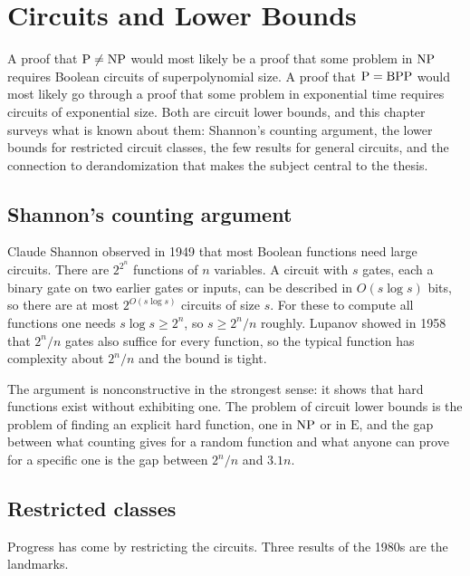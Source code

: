 \chapter{Circuits and Lower Bounds}
\label{ch:circuits}

A proof that $\mathrm{P} \neq \mathrm{NP}$ would most likely be a proof that some problem in $\mathrm{NP}$ requires Boolean circuits of superpolynomial size. A proof that $\mathrm{P} = \mathrm{BPP}$ would most likely go through a proof that some problem in exponential time requires circuits of exponential size. Both are circuit lower bounds, and this chapter surveys what is known about them: Shannon's counting argument, the lower bounds for restricted circuit classes, the few results for general circuits, and the connection to derandomization that makes the subject central to the thesis.

\section{Shannon's counting argument}

Claude Shannon observed in 1949 that most Boolean functions need large circuits. There are $2^{2^n}$ functions of $n$ variables. A circuit with $s$ gates, each a binary gate on two earlier gates or inputs, can be described in $O(s \log s)$ bits, so there are at most $2^{O(s \log s)}$ circuits of size $s$. For these to compute all functions one needs $s \log s \ge 2^n$, so $s \ge 2^n / n$ roughly. Lupanov showed in 1958 that $2^n / n$ gates also suffice for every function, so the typical function has complexity about $2^n / n$ and the bound is tight.

The argument is nonconstructive in the strongest sense: it shows that hard functions exist without exhibiting one. The problem of circuit lower bounds is the problem of finding an explicit hard function, one in $\mathrm{NP}$ or in $\mathrm{E}$, and the gap between what counting gives for a random function and what anyone can prove for a specific one is the gap between $2^n / n$ and $3.1 n$.

\section{Restricted classes}

Progress has come by restricting the circuits. Three results of the 1980s are the landmarks.

